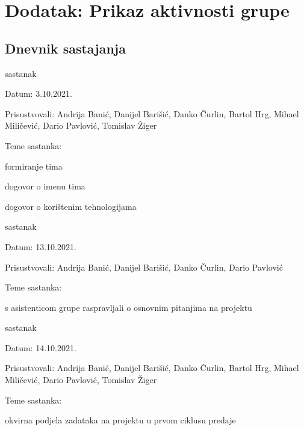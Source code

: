 \chapter*{Dodatak: Prikaz aktivnosti grupe}
		
		\section*{Dnevnik sastajanja}
		
		
		\begin{packed_enum}
			\item  sastanak
			
			\item[] \begin{packed_item}
				\item Datum: 3.10.2021.
				\item Prisustvovali: Andrija Banić, Danijel Barišić, Danko Čurlin, Bartol Hrg, Mihael Miličević, Dario Pavlović, Tomislav Žiger
				\item Teme sastanka:
				\begin{packed_item}
					\item  formiranje tima
					\item  dogovor o imenu tima
					\item  dogovor o korištenim tehnologijama
				\end{packed_item}
			\end{packed_item}
			
			\item  sastanak
			\item[] \begin{packed_item}
				\item Datum: 13.10.2021.
				\item Prisustvovali: Andrija Banić, Danijel Barišić, Danko Čurlin, Dario Pavlović
				\item Teme sastanka:
				\begin{packed_item}
					\item  s asistenticom grupe raspravljali o osnovnim pitanjima na projektu
				\end{packed_item}
			\end{packed_item}
			
			\item  sastanak
			\item[] \begin{packed_item}
				\item Datum: 14.10.2021.
				\item Prisustvovali: Andrija Banić, Danijel Barišić, Danko Čurlin, Bartol Hrg, Mihael Miličević, Dario Pavlović, Tomislav Žiger
				\item Teme sastanka:
				\begin{packed_item}
					\item  okvirna podjela zadataka na projektu u prvom ciklusu predaje
				\end{packed_item}
			\end{packed_item}
			

\end{packed_enum}
